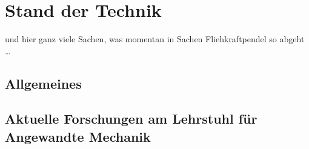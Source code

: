\chapter{Stand der Technik}


und hier ganz viele Sachen, was momentan in Sachen Fliehkraftpendel so abgeht \dots


\section{Allgemeines}




\section{Aktuelle Forschungen am Lehrstuhl für Angewandte Mechanik}